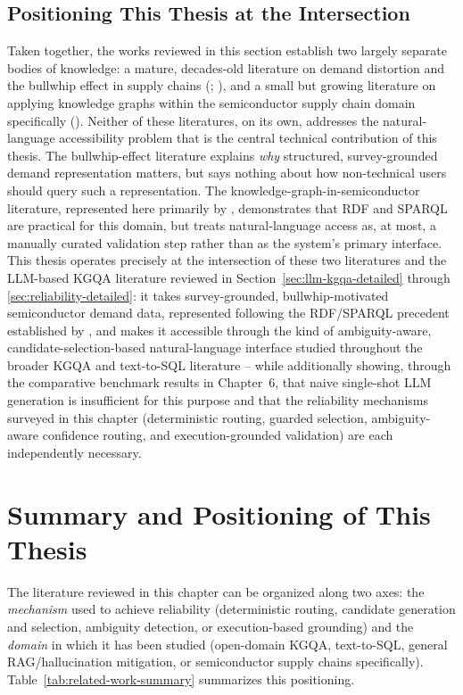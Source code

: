 \documentclass[
  12pt,
  english,
  oneside]{report}
\begin{document}
\subsection{Positioning This Thesis at the Intersection}

Taken together, the works reviewed in this section establish two largely
separate bodies of knowledge: a mature, decades-old literature on demand
distortion and the bullwhip effect in supply chains
(\citealt{lee1997bullwhip}; \citealt{chen2000quantifying}), and a small
but growing literature on applying knowledge graphs within the
semiconductor supply chain domain specifically
(\citealt{ramzy2021knowgraphpm}). Neither of these literatures, on its
own, addresses the natural-language accessibility problem that is the
central technical contribution of this thesis. The bullwhip-effect
literature explains \emph{why} structured, survey-grounded demand
representation matters, but says nothing about how non-technical users
should query such a representation. The knowledge-graph-in-semiconductor
literature, represented here primarily by \citet{ramzy2021knowgraphpm},
demonstrates that RDF and SPARQL are practical for this domain, but treats
natural-language access as, at most, a manually curated validation step
rather than as the system's primary interface. This thesis operates
precisely at the intersection of these two literatures and the
LLM-based KGQA literature reviewed in Section~\ref{sec:llm-kgqa-detailed}
through \ref{sec:reliability-detailed}: it takes survey-grounded,
bullwhip-motivated semiconductor demand data, represented following the
RDF/SPARQL precedent established by \citet{ramzy2021knowgraphpm}, and makes
it accessible through the kind of ambiguity-aware, candidate-selection-based
natural-language interface studied throughout the broader KGQA and
text-to-SQL literature -- while additionally showing, through the
comparative benchmark results in Chapter~6, that naive single-shot LLM
generation is insufficient for this purpose and that the reliability
mechanisms surveyed in this chapter (deterministic routing, guarded
selection, ambiguity-aware confidence routing, and execution-grounded
validation) are each independently necessary.

\section{Summary and Positioning of This Thesis}
\label{sec:related-work-summary}

The literature reviewed in this chapter can be organized along two axes:
the \emph{mechanism} used to achieve reliability (deterministic routing,
candidate generation and selection, ambiguity detection, or execution-based
grounding) and the \emph{domain} in which it has been studied (open-domain
KGQA, text-to-SQL, general RAG/hallucination mitigation, or
semiconductor supply chains specifically). Table~\ref{tab:related-work-summary}
summarizes this positioning.
\end{document}
